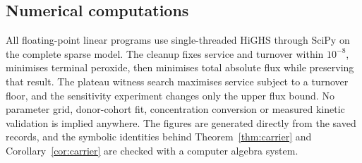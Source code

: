 \documentclass[11pt,a4paper]{article}
\theoremstyle{plain}
\theoremstyle{definition}
\theoremstyle{remark}
\begin{document}
\subsection*{Numerical computations}
All floating-point linear programs use single-threaded HiGHS
\citep{huangfu2018} through SciPy \citep{virtanen2020} on the complete sparse
model. The cleanup fixes service and turnover within $10^{-8}$, minimises
terminal peroxide, then minimises total absolute flux while preserving that
result. The plateau witness search maximises service subject to a turnover
floor, and the sensitivity experiment changes only the  upper flux
bound. No parameter grid, donor-cohort fit, concentration conversion or
measured kinetic validation is implied anywhere. The figures are generated
directly from the saved records, and the symbolic identities behind
Theorem~\ref{thm:carrier} and Corollary~\ref{cor:carrier} are checked with a
computer algebra system.



\end{document}
